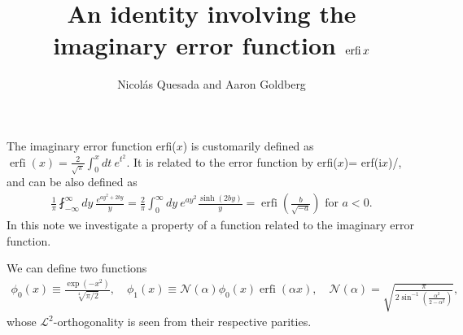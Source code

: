 \documentclass[english,12pt]{shreyasnotes}
\title{An identity involving the imaginary error function $\erfi x$}
\author{Nicol\'as Quesada and Aaron Goldberg}
\date{}
\newcommand{\eq}[1]{\begin{align}#1\end{align}}
\DeclareMathOperator{\erfi}{erfi}
\newcommand{\iu}{\text{i}}
\begin{document}
\maketitle
\thispagestyle{empty}

The imaginary error function erfi($x$) is customarily defined as $\erfi(x) = \frac{2}{\sqrt{\pi}} \int_0^x dt \ e^{t^2}$.
It is related to the error function by erfi($x$)= erf($\iu x$)/\iu, and can be also defined as
\eq{
\frac{1}{\pi} \fint_{-\infty}^{\infty} dy\ \frac{e^{a y^2 +2 b y}}{ y} = \frac{2}{\pi}\int_0^\infty dy \ e^{a y^2}\frac{\sinh(2 b y)}{ y}=\erfi\left(\frac{b}{\sqrt{-a}}\right) \text{ for } a<0.
\label{eq:erfi-principal-integral}
}
In this note we investigate a property of a function related to the imaginary error function.

We can define two functions
\eq{
  \phi_0(x)\equiv\frac{\exp\left(-x^2\right)}{\sqrt[4]{\pi/2}}, 
\quad   \phi_1(x)\equiv%
\mathcal{N}\left(\alpha\right)\phi_0\left(x\right)\erfi\left(\alpha x\right),
\quad	\mathcal{N}\left(\alpha\right)=\sqrt{\frac{\pi}{2\sin^{-1}\left(\frac{\alpha^2}{2-\alpha^2}\right)}},
}
whose $\mathcal{L}^2$-orthogonality is seen from their respective parities. 
\end{document}
